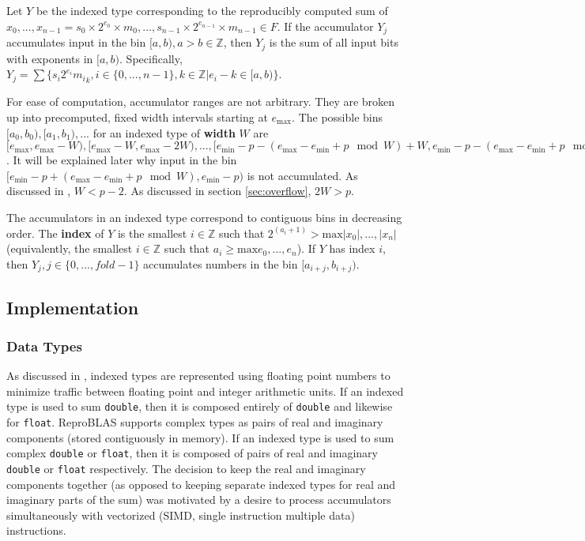 \documentclass[12pt]{article}
\providecommand{\Z}{\ensuremath{\mathbb{Z}}}
\providecommand{\min}{\ensuremath{\text{min}}}
\providecommand{\max}{\ensuremath{\text{max}}}
\theoremstyle{plain}
\begin{document}
    Let $Y$ be the indexed type corresponding to the reproducibly computed sum of $x_0, ..., x_{n - 1} = s_0 \times 2^{e_0} \times m_0, ..., s_{n - 1} \times 2^{e_{n - 1}} \times m_{n - 1} \in F$.
    If the accumulator $Y_j$ accumulates input in the bin $[a, b), a > b \in \Z$, then $Y_j$ is the sum of all input bits with exponents in $[a, b)$. Specifically, $Y_j = \sum \{s_i2^{e_i}{m_i}_k, i \in \{0, ..., n - 1\}, k \in \Z | e_i - k \in [a, b)\}$.

    For ease of computation, accumulator ranges are not arbitrary. They are broken up into precomputed, fixed width intervals starting at $e_{\max}$. The possible bins $[a_0, b_0), [a_1, b_1), ...$ for an indexed type of \textbf{width} $W$ are $[e_{\max}, e_{\max} - W), [e_{\max} - W, e_{\max} - 2W), ..., [e_{\min} - p - (e_{\max} - e_{\min} + p \mod W) + W, e_{\min} - p - (e_{\max} - e_{\min} + p \mod W))$. It will be explained later why input in the bin $[e_{\min} - p + (e_{\max} - e_{\min} + p \mod W), e_{\min} - p)$ is not accumulated. As discussed in \cite{repsum}, $W < p - 2$. As discussed in section \ref{sec:overflow}, $2W > p$.

    The accumulators in an indexed type correspond to contiguous bins in decreasing order. The \textbf{index} of $Y$ is the smallest $i \in \Z$ such that $2^(a_i + 1) > \max{|x_0|, ..., |x_n|}$ (equivalently, the smallest $i \in \Z$ such that $a_i \geq \max{e_0, ..., e_n}$). If $Y$ has index $i$, then $Y_j, j \in \{0, ..., fold - 1\}$ accumulates numbers in the bin $[a_{i + j}, b_{i + j})$.
  \subsection{Implementation}
    \subsubsection{Data Types}
      As discussed in \cite{repsum}, indexed types are represented using floating point numbers to minimize traffic between floating point and integer arithmetic units. If an indexed type is used to sum \verb|double|, then it is composed entirely of \verb|double| and likewise for \verb|float|. ReproBLAS supports complex types as pairs of real and imaginary components (stored contiguously in memory). If an indexed type is used to sum complex \verb|double| or \verb|float|, then it is composed of pairs of real and imaginary \verb|double| or \verb|float| respectively. The decision to keep the real and imaginary components together (as opposed to keeping separate indexed types for real and imaginary parts of the sum) was motivated by a desire to process accumulators simultaneously with vectorized (SIMD, single instruction multiple data) instructions.
\end{document}
